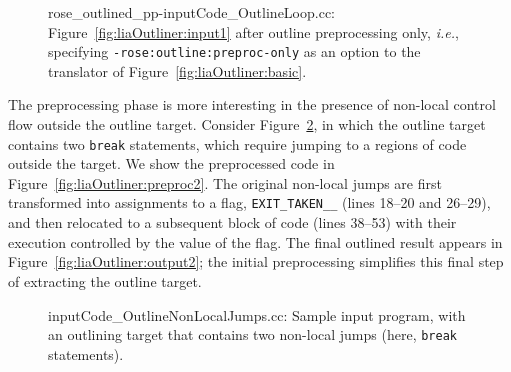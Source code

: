 \begin{figure}[!h]
{\indent
{\mySmallFontSize
\begin{latexonly}
   
\end{latexonly}
\begin{htmlonly}
   
\end{htmlonly}

}
}
\caption{rose\_outlined\_pp-inputCode\_OutlineLoop.cc:
Figure~\ref{fig:liaOutliner:input1} after outline preprocessing only,
\emph{i.e.}, specifying \texttt{-rose:outline:preproc-only} as an
option to the translator of Figure~\ref{fig:liaOutliner:basic}.}
\label{fig:liaOutliner:preproc1}
\end{figure}

The preprocessing phase is more interesting in the presence of
non-local control flow outside the outline target. Consider
Figure~\ref{fig:liaOutliner:input2}, in which the outline target
contains two \texttt{break} statements, which require jumping to a
regions of code outside the target. We show the preprocessed code in
Figure~\ref{fig:liaOutliner:preproc2}. The original non-local jumps
are first transformed into assignments to a flag,
\texttt{EXIT\_TAKEN\_\_} (lines 18--20 and 26--29), and then relocated
to a subsequent block of code (lines 38--53) with their execution
controlled by the value of the flag. The final outlined result appears
in Figure~\ref{fig:liaOutliner:output2}; the initial preprocessing
simplifies this final step of extracting the outline target.

\begin{figure}[!h]
{\indent
{\mySmallFontSize
\begin{latexonly}
   
\end{latexonly}
\begin{htmlonly}
   
\end{htmlonly}

}
}
\caption{inputCode\_OutlineNonLocalJumps.cc: Sample input program,
with an outlining target that contains two non-local jumps (here,
\texttt{break} statements).}
\label{fig:liaOutliner:input2}
\end{figure}

